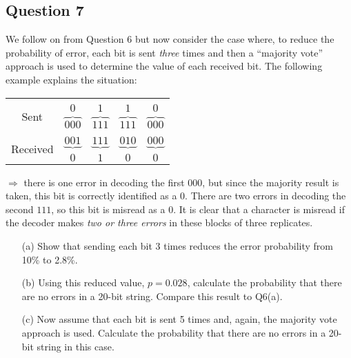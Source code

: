 \documentclass[]{report}
\begin{document}
\subsection*{Question 7}
We follow on from Question 6 but now consider the case where, to reduce the probability of error, each bit is sent \emph{three} times and then a ``majority vote'' approach is used to determine the value of each received bit. The following example explains the situation:\\[-0.5cm]
\begin{center}
\begin{tabular}{ccccc}
\hline
&&&&\\[-0.3cm]
\multirow{2}{*}{Sent} & $0$ & $1$ & $1$ & $0$ \\
& $\overbrace{000}$ & $\overbrace{111}$ & $\overbrace{111}$ & $\overbrace{000}$ \\[0.2cm]
\hline
&&&&\\[-0.3cm]
\multirow{2}{*}{Received} & $\underbrace{001}$ & $\underbrace{111}$ & $\underbrace{010}$ & $\underbrace{000}$ \\
& $0$ & $1$ & $0$ & $0$ \\[0.2cm]
\hline
\end{tabular}
\end{center}
$\Rightarrow$ there is one error in decoding the first $000$, but since the majority result is taken, this bit is correctly identified as a $0$. There are two errors in decoding the second $111$, so this bit is misread as a $0$. It is clear that a character is misread if the decoder makes \emph{two or three errors} in these blocks of three replicates.\\[-0.2cm]
\begin{itemize}
\item[(a)] Show that sending each bit 3 times reduces the error probability from 10\% to 2.8\%. \\ \item[(b)] Using this reduced value, $p=0.028$, calculate the probability that there are no errors in a 20-bit string. Compare this result to Q6(a).  \item[(c)] Now assume that each bit is sent 5 times and, again, the majority vote approach is used. Calculate the probability that there are no errors in a 20-bit string in this case. %
\end{itemize}
\end{document}
